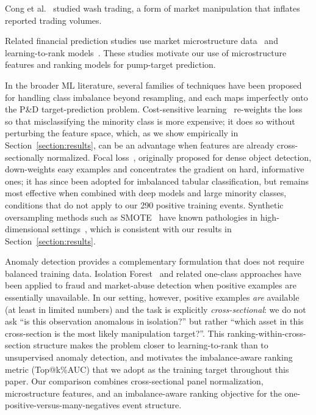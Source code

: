 \documentclass{ieeeaccess}
\begin{document}
Cong et al.~\cite{cong_washtrading_2023} studied wash trading, a form of market manipulation that inflates reported trading volumes.

Related financial prediction studies use market microstructure data~\cite{albers_frag_2022,ntakaris_midprice_2022} and learning-to-rank models~\cite{poh_ltr}. These studies motivate our use of microstructure features and ranking models for pump-target prediction.

In the broader ML literature, several families of techniques have been proposed for handling class imbalance beyond resampling, and each maps imperfectly onto the P\&D target-prediction problem. Cost-sensitive learning~\cite{elkan2001cost} re-weights the loss so that misclassifying the minority class is more expensive; it does so without perturbing the feature space, which, as we show empirically in Section~\ref{section:results}, can be an advantage when features are already cross-sectionally normalized. Focal loss~\cite{lin2017focal}, originally proposed for dense object detection, down-weights easy examples and concentrates the gradient on hard, informative ones; it has since been adopted for imbalanced tabular classification, but remains most effective when combined with deep models and large minority classes, conditions that do not apply to our 290 positive training events. Synthetic oversampling methods such as SMOTE~\cite{chawla2002smote} have known pathologies in high-dimensional settings~\cite{blagus2013smote}, which is consistent with our results in Section~\ref{section:results}.

Anomaly detection provides a complementary formulation that does not require balanced training data. Isolation Forest~\cite{liu2008isolation} and related one-class approaches have been applied to fraud and market-abuse detection when positive examples are essentially unavailable. In our setting, however, positive examples \emph{are} available (at least in limited numbers) and the task is explicitly \emph{cross-sectional}: we do not ask ``is this observation anomalous in isolation?'' but rather ``which asset in this cross-section is the most likely manipulation target?''. This ranking-within-cross-section structure makes the problem closer to learning-to-rank than to unsupervised anomaly detection, and motivates the imbalance-aware ranking metric (Top@k\%AUC) that we adopt as the training target throughout this paper. Our comparison combines cross-sectional panel normalization, microstructure features, and an imbalance-aware ranking objective for the one-positive-versus-many-negatives event structure.
\end{document}
